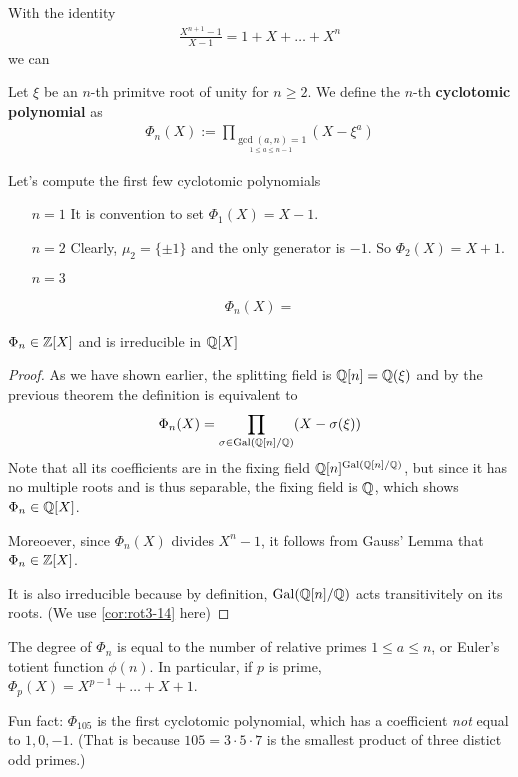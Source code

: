 With the identity
\begin{align*}
  \frac{X^{n+1}-1}{X-1} = 1 + X + \ldots + X^{n}
\end{align*}
we can 


\begin{dfn}[]\label{dfn:cyclotomic-polynomial}
  Let $\xi$ be an $n$-th primitve root of unity for $n \geq 2$.
  We define the $n$-th \textbf{cyclotomic polynomial} as
  \begin{align*}
    \Phi_n(X) := \prod_{\underset{1 \leq a \leq n-1}{\gcd(a,n)=1}} (X - \xi^{a})
  \end{align*}
\end{dfn}


Let's compute the first few cyclotomic polynomials
\begin{itemize}
  \item[$n=1$] It is convention to set $\Phi_1(X) = X -1$.
  \item[$n=2$] Clearly, $\mu_2 = \{\pm 1\}$ and the only generator is $-1$. So $\Phi_2(X) = X + 1$.
  \item[$n=3$] 
\end{itemize}
\begin{align*}
  \Phi_n(X) = 
\end{align*}

\begin{cor}[]
  $\Phi_n \in \mathbb{Z}[X]$ and is irreducible in $\mathbb{Q}[X]$
\end{cor}
\begin{proof}
  As we have shown earlier, the splitting field is $\mathbb{Q}[n] = \mathbb{Q}(\xi)$ and by the previous theorem the definition is equivalent to
  \begin{align*}
    \Phi_n(X) = \prod_{\sigma \in \operatorname{Gal}(\mathbb{Q}[n]/\mathbb{Q})}(X - \sigma(\xi))
  \end{align*}
  Note that all its coefficients are in the fixing field $\mathbb{Q}[n]^{\operatorname{Gal}(\mathbb{Q}[n]/\mathbb{Q})}$, but since
  it has no multiple roots and is thus separable, the fixing field is $\mathbb{Q}$, which shows $\Phi_n \in \mathbb{Q}[X]$.

  Moreoever, since $\Phi_n(X)$ divides $X^{n}-1$, it follows from Gauss' Lemma that $\Phi_n \in \mathbb{Z}[X]$.

  It is also irreducible because by definition, $\operatorname{Gal}(\mathbb{Q}[n]/\mathbb{Q})$ acts transitivitely on its roots. (We use \ref{cor:rot3-14} here)
\end{proof}
\begin{rem}[]
  The degree of $\Phi_n$ is equal to the number of relative primes $1 \leq a \leq n$, or Euler's totient function $\phi(n)$.
  In particular, if $p$ is prime, $\Phi_p(X) = X^{p-1} + \ldots + X + 1$.
  
  Fun fact: $\Phi_{105}$ is the first cyclotomic polynomial, which has a coefficient \emph{not} equal to $1,0,-1$.
  (That is because $105 = 3 \cdot 5 \cdot 7$ is the smallest product of three distict odd primes.)
\end{rem}

